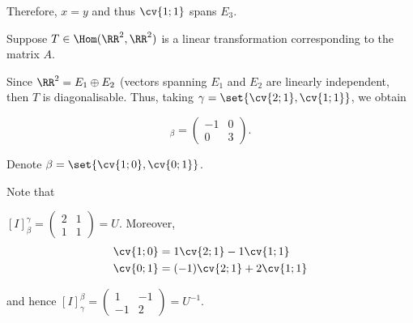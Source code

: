 \documentclass[11pt]{scrartcl}
\begin{document}
\begin{linenumbers}
\begin{soln}
    Therefore, $x = y$ and thus $\cv{1; 1}$ spans $E_{3}$.

    Suppose $T \in \Hom(\RR^2,\RR^2)$ is a linear transformation corresponding
    to the matrix $A$.

    Since $\RR^2 = E_1\oplus E_{2}$ (vectors spanning $E_1$ and
    $E_{2}$ are linearly independent, then $T$ is
    diagonalisable. Thus, taking $\gamma = \set{\cv{2;1}, \cv{1;1}}$, we obtain

    \begin{equation*}
      [T]_{\beta} =
      \begin{pmatrix}
        -1 & 0\\
        0 & 3
      \end{pmatrix}.
    \end{equation*}

    Denote $\beta = \set{\cv{1;0}, \cv{0;1}}$.

    Note that

    $[I]_{\beta}^{\gamma} =
    \begin{pmatrix}
      2 & 1\\
      1 & 1
    \end{pmatrix}  = U
    $. Moreover,
    \begin{align}
      &\cv{1;0} = 1 \cv{2;1} - 1 \cv{1;1}\\
      &\cv{0;1} =  (-1)\*\cv{2;1} +2 \cv{1;1}
    \end{align}

    and hence
    $[I]_{\gamma}^{\beta} =
    \begin{pmatrix}
      1  & -1 \\
      -1 & 2
    \end{pmatrix} = U^{-1}$.


\end{soln}
\end{linenumbers}
\end{document}
